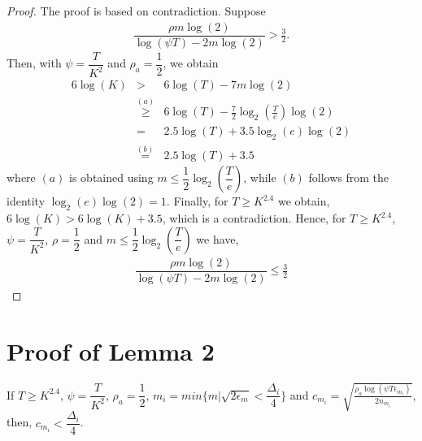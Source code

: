 \begin{proof}
The proof is based on contradiction. Suppose
\begin{eqnarray*}
\dfrac{\rho m \log(2)}{\log(\psi T) - 2m\log( 2)} > \frac{3}{2}.
\end{eqnarray*}
Then, with $\psi=\dfrac{T}{ K^2}$ and $\rho_a =\dfrac{1}{2}$, we obtain
\begin{eqnarray*}
6\log(K) 
&>& 6\log(T) - 7m\log(2) \\
&\overset{(a)}{\ge}& 6\log(T) - \frac{7}{2} \log_2\left(\frac{T}{e}\right) \log(2) \\
&=& 2.5\log(T) + 3.5 \log_2(e)\log(2)  \\
&\overset{(b)}{=}& 2.5\log(T) +3.5
\end{eqnarray*}
where $(a)$ is obtained using $m\leq \dfrac{1}{2} \log_2\left(\dfrac{T}{e}\right)$, while $(b)$ follows from the identity $\log_2(e)\log(2) =1$. Finally, for $T\ge K^{2.4}$ we obtain, $6\log(K)>6\log(K)+3.5$, which is a contradiction. Hence, for $T\geq K^{2.4}$, $\psi=\dfrac{T}{ K^2}$, $\rho=\dfrac{1}{2}$ and $m \leq \dfrac{1}{2} \log_2\left(\dfrac{T}{e}\right) $ we have, 
\begin{align*}
\dfrac{\rho m \log(2)}{\log(\psi T) - 2m\log( 2)} \leq \frac{3}{2}
\end{align*}
\end{proof}

\section{Proof of Lemma 2}
\label{App:Lemma2}
\begin{lemma}
\label{proofTheorem:Lemma:2}
If $T\geq K^{2.4}$, $\psi=\dfrac{T}{ K^2}$, $\rho_a =\dfrac{1}{2}$, $m_i = min\lbrace m|\sqrt{2\epsilon_{m} } < \dfrac{\Delta_i}{4} \rbrace $ and $c_{m_i} =\sqrt{\frac{\rho_{a}\log (\psi T\epsilon_{m_{i}})}{2 n_{m_i}}}$, then, $c_{m_i} < \dfrac{\Delta_i}{4}$.
\end{lemma}

